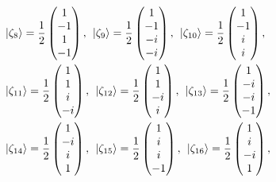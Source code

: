 \documentclass[aps,pra,reprint,groupedaddress,showkeys]{revtex4-1}
\begin{document}
\begin{equation}
\begin{split}
& \ket{\zeta_8} = \frac{1}{2}\begin{pmatrix} 1  \\ -1 \\ 1 \\-1 \end{pmatrix},\hspace{0.15cm} \ket{\zeta_9} = \frac{1}{2}\begin{pmatrix} 1 \\ -1 \\ -i \\ -i \end{pmatrix}, \hspace{0.15cm} \ket{\zeta_{10}} = \frac{1}{2}\begin{pmatrix} 1  \\ -1 \\ i \\i \end{pmatrix},\\
&\ket{\zeta_{11}} = \frac{1}{2}\begin{pmatrix} 1  \\1 \\ i \\ -i \end{pmatrix},\hspace{0.15cm} \ket{\zeta_{12}} = \frac{1}{2}\begin{pmatrix} 1  \\ 1 \\ -i \\ i \end{pmatrix}, \hspace{0.15cm} \ket{\zeta_{13}} = \frac{1}{2}\begin{pmatrix} 1 \\ -i \\ -i \\ -1 \end{pmatrix},\\
&\ket{\zeta_{14}} = \frac{1}{2}\begin{pmatrix} 1  \\ -i \\ i \\1 \end{pmatrix}, \hspace{0.15cm} \ket{\zeta_{15}} = \frac{1}{2}\begin{pmatrix} 1  \\i \\ i \\-1 \end{pmatrix},\hspace{0.15cm} \ket{\zeta_{16}} = \frac{1}{2}\begin{pmatrix} 1  \\ i \\ -i \\1 \end{pmatrix},\\

\end{split}
\end{equation}
\end{document}
